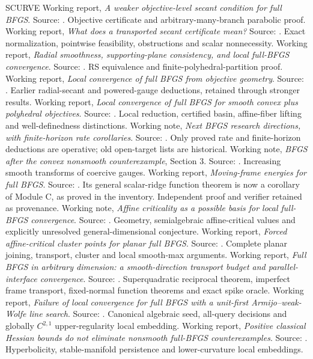 \begin{thebibliography}{SCURVE}
 Working report, \emph{A weaker objective-level secant condition for full BFGS}. Source: . Objective certificate and arbitrary-many-branch parabolic proof.
 Working report, \emph{What does a transported secant certificate mean?} Source: . Exact normalization, pointwise feasibility, obstructions and scalar nonnecessity.
 Working report, \emph{Radial smoothness, supporting-plane consistency, and local full-BFGS convergence}. Source: . RS equivalence and finite-polyhedral-partition proof.
 Working report, \emph{Local convergence of full BFGS from objective geometry}. Source: . Earlier radial-secant and powered-gauge deductions, retained through stronger results.
 Working report, \emph{Local convergence of full BFGS for smooth convex plus polyhedral objectives}. Source: . Local reduction, certified basin, affine-fiber lifting and well-definedness distinctions.
 Working note, \emph{Next BFGS research directions, with finite-horizon rate corollaries}. Source: . Only proved rate and finite-horizon deductions are operative; old open-target lists are historical.
 Working note, \emph{BFGS after the convex nonsmooth counterexample}, Section 3. Source: . Increasing smooth transforms of coercive gauges.
 Working report, \emph{Moving-frame energies for full BFGS}. Source: . Its general scalar-ridge function theorem is now a corollary of Module C, as proved in the inventory. Independent proof and verifier retained as provenance.
 Working note, \emph{Affine criticality as a possible basis for local full-BFGS convergence}. Source: . Geometry, semialgebraic affine-critical values and explicitly unresolved general-dimensional conjecture.
 Working report, \emph{Forced affine-critical cluster points for planar full BFGS}. Source: . Complete planar joining, transport, cluster and local smooth-max arguments.
 Working report, \emph{Full BFGS in arbitrary dimension: a smooth-direction transport budget and parallel-interface convergence}. Source: . Superquadratic reciprocal theorem, imperfect frame transport, fixed-normal function theorems and exact spike oracle.
 Working report, \emph{Failure of local convergence for full BFGS with a unit-first Armijo--weak-Wolfe line search}. Source: . Canonical algebraic seed, all-query decisions and globally $C^{2,1}$ upper-regularity local embedding.
 Working report, \emph{Positive classical Hessian bounds do not eliminate nonsmooth full-BFGS counterexamples}. Source: . Hyperbolicity, stable-manifold persistence and lower-curvature local embeddings.
\end{thebibliography}
